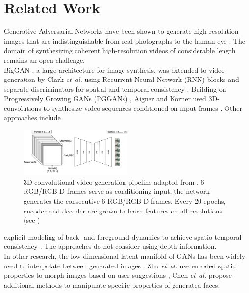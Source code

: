 \documentclass[10pt,twocolumn,letterpaper]{article}
\begin{document}
\section{Related Work}
Generative Adversarial Networks have been shown to generate high-resolution images that are indistinguishable from real photographs to the human eye \cite{Karras2018a, Karras2018}. The domain of synthesizing coherent high-resolution videos of considerable length remains an open challenge.\\%
BigGAN \cite{Brock2018}, a large architecture for image synthesis, was extended to video generation by Clark {\em et\ al.} using Recurrent Neural Network (RNN) blocks and separate discriminators for spatial and temporal consistency \cite{Clark2019}. 
Building on Progressively Growing GANs (PGGANs) \cite{Karras2018}, Aigner and K\"orner used 3D-convolutions to synthesize video sequences conditioned on input frames \cite{Aigner2019}. Other approaches include \begin{figure}[H]
	\centering
	\includegraphics[width=0.5\textwidth]{graphics/FutureGAN/FutureGAN.png}
	\caption{3D-convolutional video generation pipeline adapted from \cite{Aigner2019}. 6 RGB/RGB-D frames serve as conditioning input, the network generates the consecutive 6 RGB/RGB-D frames. Every 20 epochs, encoder and decoder are grown to learn features on all resolutions (see \cite{Karras2018})}
	\label{fig:futuregan}
\end{figure} explicit modeling of back- and foreground dynamics to achieve spatio-temporal consistency \cite{Vondrick2016}. The approaches do not consider using depth information. \\
In other research, the low-dimensional latent manifold of GANs has been widely used to interpolate between generated images \cite{Karras2018}. Zhu {\em et\ al.} use encoded spatial properties to morph images based on user suggestions \cite{Zhu2016}, Chen {\em et\ al.} \cite{Chen2019} propose additional methods to manipulate specific properties of generated faces.
\end{document}
